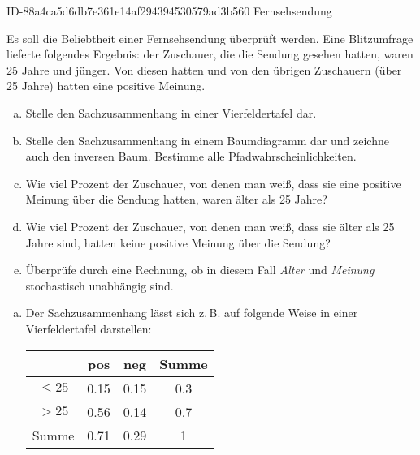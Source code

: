 \begin{exercise}
      {ID-88a4ca5d6db7e361e14af294394530579ad3b560}
      {Fernsehsendung}
  \ifproblem\problem\par
    Es soll die Beliebtheit einer Fernsehsendung überprüft werden.
    Eine Blitzumfrage lieferte folgendes Ergebnis:  der Zuschauer,
    die die Sendung gesehen hatten, waren 25 Jahre und jünger.
    Von diesen hatten  und von den übrigen Zuschauern (über 25
    Jahre) hatten  eine positive Meinung.
    \begin{enumerate}[a)]
      \item Stelle den Sachzusammenhang in einer Vierfeldertafel dar.
      \item Stelle den Sachzusammenhang in einem Baumdiagramm dar und
            zeichne auch den inversen Baum. Bestimme alle Pfadwahrscheinlichkeiten.
      \item Wie viel Prozent der Zuschauer, von denen man weiß, dass sie
            eine positive Meinung über die Sendung hatten, waren älter
            als 25 Jahre?
      \item Wie viel Prozent der Zuschauer, von denen man weiß, dass sie
            älter als 25 Jahre sind, hatten keine positive Meinung über
            die Sendung?
      \item Überprüfe durch eine Rechnung, ob in diesem Fall \textit{Alter} und
            \textit{Meinung} stochastisch unabhängig sind.
    \end{enumerate}
  \fi
  \ifoutcome\outcome\par
    \begin{enumerate}[a)]
      \item Der Sachzusammenhang lässt sich z.\,B. auf folgende Weise in
            einer Vierfeldertafel darstellen:
            \begin{center}
              \renewcommand{\arraystretch}{1.25}%
              \begin{tabular}{|c||c|c||c|}
                \hline
                         & pos        & neg        & Summe     \\
                \hline
                \hline
                $\leq25$ & \num{0.15} & \num{0.15} & \num{0.3} \\
                \hline
                $>25$    & \num{0.56} & \num{0.14} & \num{0.7} \\
                \hline
                \hline
                Summe    & \num{0.71} & \num{0.29} & \num{1}   \\

\end{tabular}
\end{center}
\end{enumerate}
\end{exercise}
